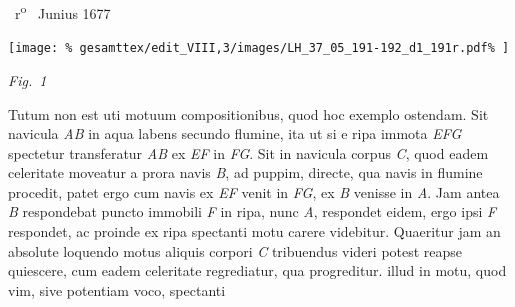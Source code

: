 %
\newpage
%
%
\frenchspacing
\vspace{8mm}
\count{}%
\count{}%
\count{}
\pstart%
\normalsize%
\noindent%
~r\textsuperscript{o}\rbrack\
\pend 
%
\pstart
{} Junius 1677
\pend
%
%
\vspace{1.0em} %
\centerline{%
\texttt{[image: \%
gesamttex/edit\_VIII,3/images/LH\_37\_05\_191-192\_d1\_191r.pdf\%
]}} 
\vspace{0.5em}
\centerline{%
\lbrack\textit{Fig.~1}\rbrack%
}
\vspace{1.5em}
%
\pstart \noindent
Tutum non est uti motuum compositionibus,%
\protect{} quod hoc
exemplo ostendam. Sit %
navicula\protect{} \textit{AB} in aqua labens
secundo flumine,%
\protect{} ita ut si e %
ripa\protect{} immota \textit{EFG} spectetur
transferatur \textit{AB} ex \textit{EF} in \textit{FG}. Sit in %
navicula\protect\index{Sachverzeichnis}{navicula} corpus \textit{C}, quod
eadem celeritate moveatur a prora %
navis\protect{} \textit{B}, ad puppim, directe, qua
%
navis\protect{} in flumine%
\protect{} procedit, patet ergo cum %
navis\protect\index{Sachverzeichnis}{navis} ex 
\textit{EF} venit
in \textit{FG}, 
%
%
ex \textit{B} venisse in \textit{A}. Jam antea \textit{B} respondebat
puncto immobili \textit{F} in ripa, nunc \textit{A}, respondet eidem, ergo
%
%
ipsi \textit{F} respondet, ac proinde ex %
ripa\protect{} spectanti
motu carere videbitur. Quaeritur jam an absolute 
loquendo %
motus\protect{} aliquis corpori \textit{C} tribuendus 
%
%
videri potest reapse quiescere, cum eadem
%
celeritate regrediatur,
%
qua progreditur. 
%
%
illud in motu,%
\protect{} quod vim,%
\protect{} sive potentiam%
\protect{} voco, spectanti
